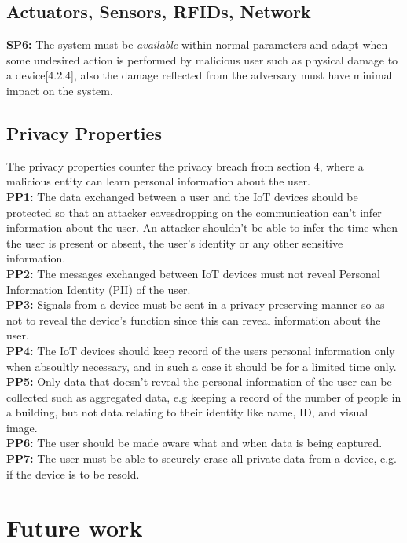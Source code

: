 \documentclass{llncs}
\begin{document}
\subsection*{Actuators, Sensors, RFIDs, Network}
\textbf{SP6:} The system must be \textit{available} within normal parameters and adapt when some undesired action is performed by malicious user such as physical damage to a device[4.2.4], also the damage reflected from the adversary must have minimal impact on the system.\\

\subsection{Privacy Properties}
The privacy properties counter the privacy breach from section 4, where a malicious entity can learn personal information about the user.\\
\textbf{PP1:} The data exchanged between a user and the IoT devices should be protected so that an attacker eavesdropping on the communication can't infer information about the user. An attacker shouldn't be able to infer the time when the user is present or absent, the user's identity or any other sensitive information. \\
\textbf{PP2:} The messages exchanged between IoT devices must not reveal Personal Information Identity (PII) of the user.\\
\textbf{PP3:} Signals from a device must be sent in a privacy preserving manner so as not to reveal the device's function since this can reveal information about the user.\\
\textbf{PP4:} The IoT devices should keep record of the users personal information only when absoultly necessary, and in such a case it should be for a limited time only. \\
\textbf{PP5:} Only data that doesn't reveal the personal information of the user can be collected such as aggregated data, e.g keeping a record of the number of people in a building, but not data relating to their identity like name, ID, and visual image.\\
\textbf{PP6:} The user should be made aware what and when data is being captured.\\
\textbf{PP7:} The user must be able to securely erase all private data from a device, e.g. if the device is to be resold.\\

\section{Future work}
\end{document}
